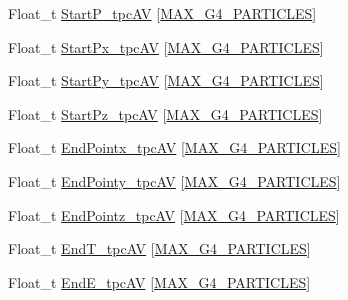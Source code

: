 \begin{DoxyCompactItemize}
\item 
Float\-\_\-t \hyperlink{classanatree_a32c58d98d48ac9acd69666d3699de6ba}{Start\-P\-\_\-tpc\-A\-V} \mbox{[}\hyperlink{anatree__core__v09410002_8h_aa5cbba5cc53c011e88805f38503de894}{M\-A\-X\-\_\-\-G4\-\_\-\-P\-A\-R\-T\-I\-C\-L\-E\-S}\mbox{]}
\item 
Float\-\_\-t \hyperlink{classanatree_a424d9106c9827a8829e5d001726d2d2c}{Start\-Px\-\_\-tpc\-A\-V} \mbox{[}\hyperlink{anatree__core__v09410002_8h_aa5cbba5cc53c011e88805f38503de894}{M\-A\-X\-\_\-\-G4\-\_\-\-P\-A\-R\-T\-I\-C\-L\-E\-S}\mbox{]}
\item 
Float\-\_\-t \hyperlink{classanatree_adbef8aabd6ce8b49f666f7857aa07530}{Start\-Py\-\_\-tpc\-A\-V} \mbox{[}\hyperlink{anatree__core__v09410002_8h_aa5cbba5cc53c011e88805f38503de894}{M\-A\-X\-\_\-\-G4\-\_\-\-P\-A\-R\-T\-I\-C\-L\-E\-S}\mbox{]}
\item 
Float\-\_\-t \hyperlink{classanatree_a41bbac8dc4d0708fb0d79470eb4f08ac}{Start\-Pz\-\_\-tpc\-A\-V} \mbox{[}\hyperlink{anatree__core__v09410002_8h_aa5cbba5cc53c011e88805f38503de894}{M\-A\-X\-\_\-\-G4\-\_\-\-P\-A\-R\-T\-I\-C\-L\-E\-S}\mbox{]}
\item 
Float\-\_\-t \hyperlink{classanatree_af869b7b410c8f9e23ea42a8e74650894}{End\-Pointx\-\_\-tpc\-A\-V} \mbox{[}\hyperlink{anatree__core__v09410002_8h_aa5cbba5cc53c011e88805f38503de894}{M\-A\-X\-\_\-\-G4\-\_\-\-P\-A\-R\-T\-I\-C\-L\-E\-S}\mbox{]}
\item 
Float\-\_\-t \hyperlink{classanatree_aca35df4eeea9f585092b6744f93e62d6}{End\-Pointy\-\_\-tpc\-A\-V} \mbox{[}\hyperlink{anatree__core__v09410002_8h_aa5cbba5cc53c011e88805f38503de894}{M\-A\-X\-\_\-\-G4\-\_\-\-P\-A\-R\-T\-I\-C\-L\-E\-S}\mbox{]}
\item 
Float\-\_\-t \hyperlink{classanatree_a88288469c893f3ecc7d10625a5a37b1c}{End\-Pointz\-\_\-tpc\-A\-V} \mbox{[}\hyperlink{anatree__core__v09410002_8h_aa5cbba5cc53c011e88805f38503de894}{M\-A\-X\-\_\-\-G4\-\_\-\-P\-A\-R\-T\-I\-C\-L\-E\-S}\mbox{]}
\item 
Float\-\_\-t \hyperlink{classanatree_a4e1a7bede023edc6626c30d762b31866}{End\-T\-\_\-tpc\-A\-V} \mbox{[}\hyperlink{anatree__core__v09410002_8h_aa5cbba5cc53c011e88805f38503de894}{M\-A\-X\-\_\-\-G4\-\_\-\-P\-A\-R\-T\-I\-C\-L\-E\-S}\mbox{]}
\item 
Float\-\_\-t \hyperlink{classanatree_a16584dc21d831d967da68d2b7dec4ccf}{End\-E\-\_\-tpc\-A\-V} \mbox{[}\hyperlink{anatree__core__v09410002_8h_aa5cbba5cc53c011e88805f38503de894}{M\-A\-X\-\_\-\-G4\-\_\-\-P\-A\-R\-T\-I\-C\-L\-E\-S}\mbox{]}
\item 

\end{DoxyCompactItemize}
